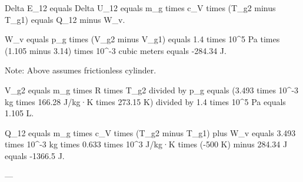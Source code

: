 Delta E_12 equals Delta U_12 equals m_g times c_V times (T_g2 minus T_g1) equals Q_12 minus W_v.  

W_v equals p_g times (V_g2 minus V_g1) equals 1.4 times 10^5 Pa times (1.105 minus 3.14) times 10^-3 cubic meters equals -284.34 J.  

Note: Above assumes frictionless cylinder.  

V_g2 equals m_g times R times T_g2 divided by p_g equals (3.493 times 10^-3 kg times 166.28 J/kg·K times 273.15 K) divided by 1.4 times 10^5 Pa equals 1.105 L.  

Q_12 equals m_g times c_V times (T_g2 minus T_g1) plus W_v equals 3.493 times 10^-3 kg times 0.633 times 10^3 J/kg·K times (-500 K) minus 284.34 J equals -1366.5 J.  

---